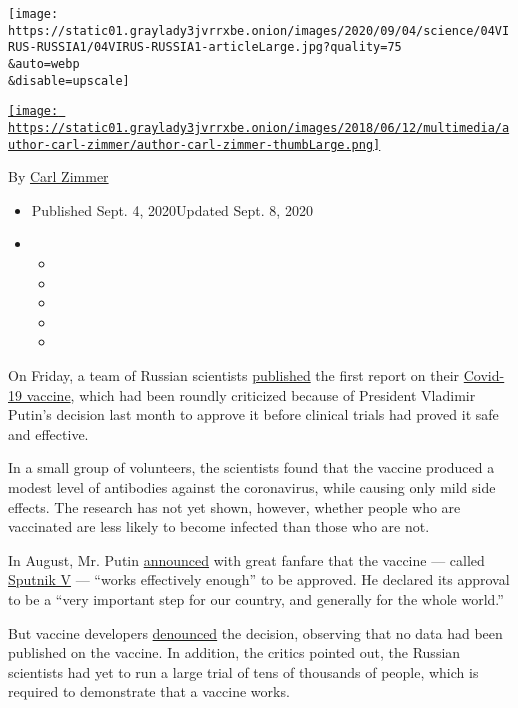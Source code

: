 \texttt{[image: https://static01.graylady3jvrrxbe.onion/images/2020/09/04/science/04VIRUS-RUSSIA1/04VIRUS-RUSSIA1-articleLarge.jpg?quality=75\\\&auto=webp\\\&disable=upscale]}

\href{https://www.nytimes3xbfgragh.onion/by/carl-zimmer}{\texttt{[image: https://static01.graylady3jvrrxbe.onion/images/2018/06/12/multimedia/author-carl-zimmer/author-carl-zimmer-thumbLarge.png]}}

By \href{https://www.nytimes3xbfgragh.onion/by/carl-zimmer}{Carl Zimmer}

\begin{itemize}
\item
  Published Sept. 4, 2020Updated Sept. 8, 2020
\item
  \begin{itemize}
  \item
  \item
  \item
  \item
  \item
  \end{itemize}
\end{itemize}

On Friday, a team of Russian scientists
\href{https://www.thelancet.com/journals/lancet/article/PIIS0140-6736(20)31866-3/fulltext}{published}
the first report on their
\href{https://www.nytimes3xbfgragh.onion/2020/09/08/health/9-drug-companies-pledge-coronavirus-vaccine.html}{Covid-19
vaccine}, which had been roundly criticized because of President
Vladimir Putin's decision last month to approve it before clinical
trials had proved it safe and effective.

In a small group of volunteers, the scientists found that the vaccine
produced a modest level of antibodies against the coronavirus, while
causing only mild side effects. The research has not yet shown, however,
whether people who are vaccinated are less likely to become infected
than those who are not.

In August, Mr. Putin
\href{https://www.nytimes3xbfgragh.onion/2020/08/11/world/europe/russia-coronavirus-vaccine-approval.html}{announced}
with great fanfare that the vaccine --- called
\href{https://sputnikvaccine.com/}{Sputnik V} --- ``works effectively
enough'' to be approved. He declared its approval to be a ``very
important step for our country, and generally for the whole world.''

But vaccine developers
\href{https://www.nytimes3xbfgragh.onion/2020/08/11/health/russia-covid-19-vaccine-safety.html}{denounced}
the decision, observing that no data had been published on the vaccine.
In addition, the critics pointed out, the Russian scientists had yet to
run a large trial of tens of thousands of people, which is required to
demonstrate that a vaccine works.

